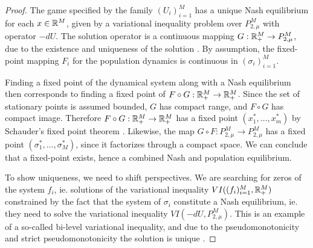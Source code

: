 \begin{proof}
  The game specified by the family $(U_i)_{i=1}^M$ has a unique Nash equilibrium for each $x\in \mathbb{R}^M$, given by a variational inequality problem over $P_{2,\mu}^M$ with operator $-dU$. The solution operator is a continuous mapping $G: \mathbb{R}_+^M \to P_{2,\mu}^M$, due to the existence and uniqueness of the solution  \cite[Theorem 4.2]{barbagallo2009continuity}. By assumption, the fixed-point mapping $F_i$ for the population dynamics is continuous in $(\sigma_i)_{i=1}^M$.

  Finding a fixed point of the dynamical system along with a Nash equilibrium then corresponds to finding a fixed point of $F\circ G: \mathbb{R}_+^M \to \mathbb{R}_+^M$. Since the set of stationary points is assumed bounded, $G$ has compact range, and $F\circ G$ has compact image. Therefore $F\circ G:\mathbb{R}_+^M \to \mathbb{R}_+^M$ has a fixed point $(x_1^*, \dots, x_m^*)$ by Schauder's fixed point theorem \citep[Theorem 3.2, p. 119]{granas2003elementary}. Likewise, the map $G\circ F:P_{2,\mu}^M \to P_{2,\mu}^M$ has a fixed point $(\sigma_1^*,\dots, \sigma_M^*)$, since it factorizes through a compact space. We can conclude that a fixed-point exists, hence a combined Nash and population equilibrium.

  To show uniqueness, we need to shift perspectives. We are searching for zeros of the system $f_i$, ie. solutions of the variational inequality $VI((f_i)_{i=1}^M, \mathbb{R}_+^M)$ constrained by the fact that the system of $\sigma_i$ constitute a Nash equilibrium, ie. they need to solve the variational inequality $VI(-dU,P_{2,\mu}^M)$. This is an example of a so-called bi-level variational inequality, and due to the pseudomonotonicity and strict pseudomonotonicity the solution is unique \citep{chen2014bilevel}.


\end{proof}
